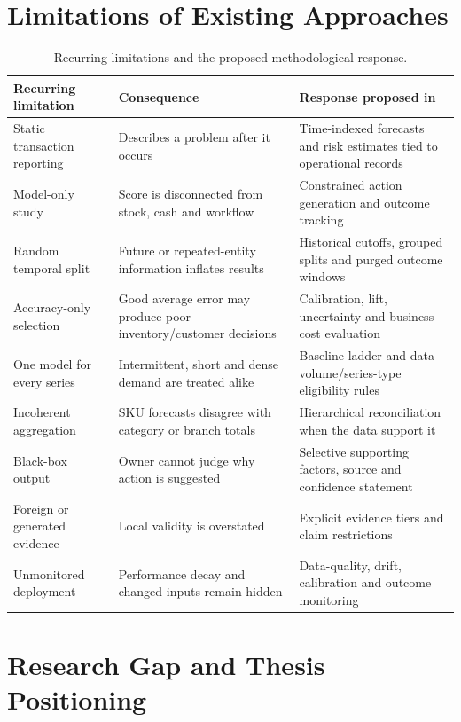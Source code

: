 \section{Limitations of Existing Approaches}

\begin{table}[H]
\centering
\small
\caption{Recurring limitations and the proposed methodological response.}
\label{tab:system_gaps}
\begin{tabularx}{\textwidth}{|p{}|Y|Y|}
\hline
\textbf{Recurring limitation} & \textbf{Consequence} & \textbf{Response proposed in \system{}} \\
\hline
Static transaction reporting & Describes a problem after it occurs & Time-indexed forecasts and risk estimates tied to operational records \\
Model-only study & Score is disconnected from stock, cash and workflow & Constrained action generation and outcome tracking \\
Random temporal split & Future or repeated-entity information inflates results & Historical cutoffs, grouped splits and purged outcome windows \\
Accuracy-only selection & Good average error may produce poor inventory/customer decisions & Calibration, lift, uncertainty and business-cost evaluation \\
One model for every series & Intermittent, short and dense demand are treated alike & Baseline ladder and data-volume/series-type eligibility rules \\
Incoherent aggregation & SKU forecasts disagree with category or branch totals & Hierarchical reconciliation when the data support it \\
Black-box output & Owner cannot judge why action is suggested & Selective supporting factors, source and confidence statement \\
Foreign or generated evidence & Local validity is overstated & Explicit evidence tiers and claim restrictions \\
Unmonitored deployment & Performance decay and changed inputs remain hidden & Data-quality, drift, calibration and outcome monitoring \\
\hline
\end{tabularx}
\end{table}

\section{Research Gap and Thesis Positioning}
\label{sec:research_gap}

